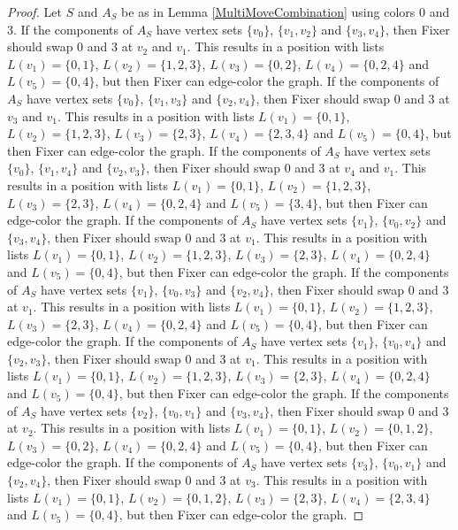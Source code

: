 \documentclass[12pt]{amsart}
\theoremstyle{plain}
\theoremstyle{definition}
\theoremstyle{remark}
\begin{document}
\begin{proof}
Let $S$ and $A_S$ be as in Lemma \ref{MultiMoveCombination} using colors $0$ and $3$. If the components of $A_S$ have vertex sets $\{v_0\}$, $\{v_1, v_2\}$ and $\{v_3, v_4\}$, then Fixer should swap 0 and 3 at $v_2$ and $v_1$. This results in a position with lists $L(v_1) = \{0, 1\}$, $L(v_2) = \{1, 2, 3\}$, $L(v_3) = \{0, 2\}$, $L(v_4) = \{0, 2, 4\}$ and $L(v_5) = \{0, 4\}$, but then Fixer can edge-color the graph.
If the components of $A_S$ have vertex sets $\{v_0\}$, $\{v_1, v_3\}$ and $\{v_2, v_4\}$, then Fixer should swap 0 and 3 at $v_3$ and $v_1$. This results in a position with lists $L(v_1) = \{0, 1\}$, $L(v_2) = \{1, 2, 3\}$, $L(v_3) = \{2, 3\}$, $L(v_4) = \{2, 3, 4\}$ and $L(v_5) = \{0, 4\}$, but then Fixer can edge-color the graph.
If the components of $A_S$ have vertex sets $\{v_0\}$, $\{v_1, v_4\}$ and $\{v_2, v_3\}$, then Fixer should swap 0 and 3 at $v_4$ and $v_1$. This results in a position with lists $L(v_1) = \{0, 1\}$, $L(v_2) = \{1, 2, 3\}$, $L(v_3) = \{2, 3\}$, $L(v_4) = \{0, 2, 4\}$ and $L(v_5) = \{3, 4\}$, but then Fixer can edge-color the graph.
If the components of $A_S$ have vertex sets $\{v_1\}$, $\{v_0, v_2\}$ and $\{v_3, v_4\}$, then Fixer should swap 0 and 3 at $v_1$. This results in a position with lists $L(v_1) = \{0, 1\}$, $L(v_2) = \{1, 2, 3\}$, $L(v_3) = \{2, 3\}$, $L(v_4) = \{0, 2, 4\}$ and $L(v_5) = \{0, 4\}$, but then Fixer can edge-color the graph.
If the components of $A_S$ have vertex sets $\{v_1\}$, $\{v_0, v_3\}$ and $\{v_2, v_4\}$, then Fixer should swap 0 and 3 at $v_1$. This results in a position with lists $L(v_1) = \{0, 1\}$, $L(v_2) = \{1, 2, 3\}$, $L(v_3) = \{2, 3\}$, $L(v_4) = \{0, 2, 4\}$ and $L(v_5) = \{0, 4\}$, but then Fixer can edge-color the graph.
If the components of $A_S$ have vertex sets $\{v_1\}$, $\{v_0, v_4\}$ and $\{v_2, v_3\}$, then Fixer should swap 0 and 3 at $v_1$. This results in a position with lists $L(v_1) = \{0, 1\}$, $L(v_2) = \{1, 2, 3\}$, $L(v_3) = \{2, 3\}$, $L(v_4) = \{0, 2, 4\}$ and $L(v_5) = \{0, 4\}$, but then Fixer can edge-color the graph.
If the components of $A_S$ have vertex sets $\{v_2\}$, $\{v_0, v_1\}$ and $\{v_3, v_4\}$, then Fixer should swap 0 and 3 at $v_2$. This results in a position with lists $L(v_1) = \{0, 1\}$, $L(v_2) = \{0, 1, 2\}$, $L(v_3) = \{0, 2\}$, $L(v_4) = \{0, 2, 4\}$ and $L(v_5) = \{0, 4\}$, but then Fixer can edge-color the graph.
If the components of $A_S$ have vertex sets $\{v_3\}$, $\{v_0, v_1\}$ and $\{v_2, v_4\}$, then Fixer should swap 0 and 3 at $v_3$. This results in a position with lists $L(v_1) = \{0, 1\}$, $L(v_2) = \{0, 1, 2\}$, $L(v_3) = \{2, 3\}$, $L(v_4) = \{2, 3, 4\}$ and $L(v_5) = \{0, 4\}$, but then Fixer can edge-color the graph.

\end{proof}
\end{document}
